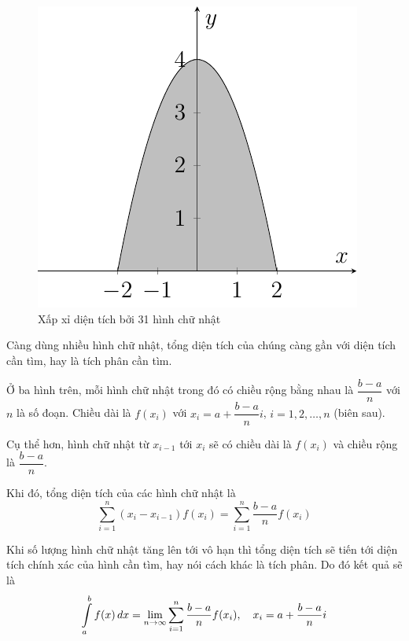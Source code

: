 \begin{figure}[htb]
	\centering
	\includegraphics[page=4]{analytic_geometry/riemann_sum.pdf}
	\caption{Xấp xỉ diện tích bởi 31 hình chữ nhật}
	\label{int4}
\end{figure}

Càng dùng nhiều hình chữ nhật, tổng diện tích của chúng càng gần với diện tích cần tìm, hay là tích phân cần tìm.

Ở ba hình trên, mỗi hình chữ nhật trong đó có chiều rộng bằng nhau là $\dfrac{b-a}{n}$ với $n$ là số đoạn. Chiều dài là $f(x_i)$ với $x_i = a + \dfrac{b-a}{n} i$, $i = 1, 2, \ldots, n$ (biên sau).

Cụ thể hơn, hình chữ nhật từ $x_{i-1}$ tới $x_i$ sẽ có chiều dài là $f(x_i)$ và chiều rộng là $\dfrac{b-a}{n}$. %

Khi đó, tổng diện tích của các hình chữ nhật là
\begin{equation}
	\sum_{i=1}^n (x_{i} - x_{i-1}) f(x_i) = \sum_{i=1}^n \frac{b-a}{n} f(x_i)
\end{equation}

Khi số lượng hình chữ nhật tăng lên tới vô hạn thì tổng diện tích sẽ tiến tới diện tích chính xác của hình cần tìm, hay nói cách khác là tích phân. Do đó kết quả sẽ là
\begin{equation}
	\int\displaylimits_{a}^{b} f(x)\,dx = \lim_{n \to \infty} \sum_{i=1}^{n} \frac{b-a}{n} f(x_i), \quad x_i = a + \frac{b-a}{n} i
\end{equation}

